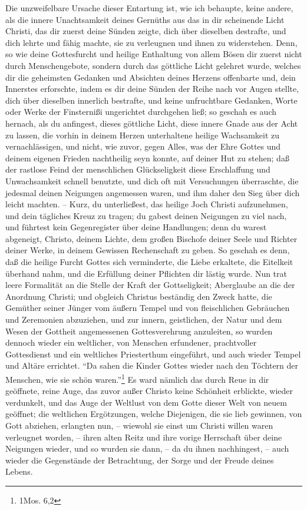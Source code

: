 Die unzweifelbare Ursache dieser Entartung ist, wie ich behaupte, keine andere, als die innere Unachtsamkeit deines Gernüths aus das in dir scheinende Licht Christi, das dir zuerst deine Sünden zeigte, dich über dieselben destrafte, und dich lehrte und fähig machte, sie zu verleugnen und ihnen zu widerstehen. Denn, so wie deine Gottesfurcht und heilige Enthaltung von allem Bösen dir zuerst nicht durch Menschengebote, sondern durch das göttliche Licht gelehret wurde, welches dir die geheimsten Gedanken und Absichten deines Herzens offenbarte und, dein Innerstes erforschte, indem es dir deine Sünden der Reihe nach vor Augen stellte, dich über dieselben innerlich bestrafte, und keine unfruchtbare Gedanken, Worte oder Werke der Finsternißi ungerichtet durchgehen ließ; so geschah es auch hernach, als du anfingest, dieses göttliche Licht, diese innere Gnade aus der Acht zu lassen, die vorhin in deinem Herzen unterhaltene heilige Wachsamkeit zu vernachlässigen, und nicht, wie zuvor, gegen Alles, was der Ehre Gottes und deinem eigenen Frieden nachtheilig seyn konnte, auf deiner Hut zu stehen; daß der rastlose Feind der menschlichen Glückseligkeit diese Erschlaffung und Unwachsamkeit schnell benutzte, und dich oft mit Versuchungen überraschte, die jedesmal deinen Neigungen angemessen waren, und ihm daher den Sieg über dich leicht machten. -- Kurz, du unterließest, das heilige Joch Christi aufzunehmen, und dein tägliches Kreuz zu tragen; du gabest deinen Neigungen zu viel nach, und führtest kein Gegenregister über deine Handlungen; denn du warest abgeneigt, Christo, deinem Lichte, dem großen Bischofe deiner Seele und Richter deiner Werke, in deinem Gewissen Rechenschaft zu geben. So geschah es denn, daß die heilige Furcht Gottes sich verminderte, die Liebe erkaltete, die Eitelkeit überhand nahm, und die Erfüllung deiner Pflichten dir lästig wurde. Nun trat leere Formalität an die Stelle der Kraft der Gottseligkeit; Aberglaube an die der Anordnung Christi; und obgleich Christus beständig den Zweck hatte, die Gemüther seiner Jünger vom äußern Tempel und von fleischlichen Gebräuchen und Zeremonien abzuziehen, und zur innern, geistlichen, der Natur und dem Wesen der Gottheit angemessenen Gottesverehrung anzuleiten, so wurden dennoch wieder ein weltlicher, von Menschen erfundener, prachtvoller Gottesdienst und ein weltliches Priesterthum eingeführt, und auch wieder Tempel und Altäre errichtet. "`Da sahen die Kinder Gottes wieder nach den Töchtern der Menschen, wie sie schön waren."'\footnote{1Mos. 6,2} Es ward nämlich das durch Reue in dir geöffnete, reine Auge, das zuvor außer Christo keine Schönheit erblickte, wieder verdunkelt, und das Auge der Weltlust von dem Gotte dieser Welt von neuem geöffnet; die weltlichen Ergötzungen, welche Diejenigen, die sie lieb gewinnen, von Gott abziehen, erlangten nun, -- wiewohl sie einst um Christi willen waren verleugnet worden, -- ihren alten Reitz und ihre vorige Herrschaft über deine Neigungen wieder, und so wurden sie dann, -- da du ihnen nachhingest, -- auch wieder die Gegenstände der Betrachtung, der Sorge und der Freude deines Lebens.

